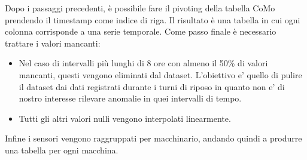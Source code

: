 Dopo i passaggi precedenti, è possibile fare il pivoting della tabella CoMo  prendendo il timestamp come indice di riga. Il risultato è una tabella in cui ogni colonna corrisponde a una serie temporale. 
Come passo finale è necessario trattare i valori mancanti:
\begin{itemize}
\item Nel caso di intervalli più lunghi di 8 ore con almeno il 50\% di valori mancanti, questi vengono eliminati dal dataset. L'obiettivo e' quello di pulire il dataset dai dati registrati durante i turni di riposo in quanto non e' di nostro interesse rilevare anomalie in quei intervalli di tempo.
\item Tutti gli altri valori nulli vengono interpolati linearmente.
\end{itemize}
Infine i sensori vengono raggruppati per macchinario, andando quindi a produrre una tabella per ogni macchina.
